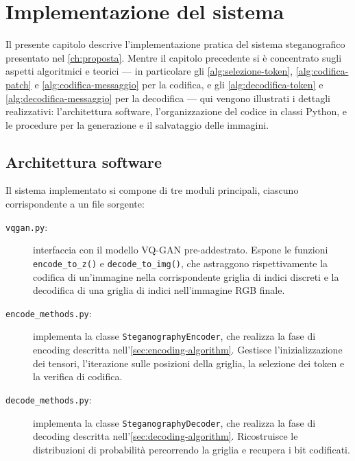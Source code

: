 
\chapter{Implementazione del sistema}
\label{ch:implementazione}

Il presente capitolo descrive l'implementazione pratica del sistema steganografico presentato nel \autoref{ch:proposta}. Mentre il capitolo precedente si è concentrato sugli aspetti algoritmici e teorici — in particolare gli \autoref{alg:selezione-token}, \ref{alg:codifica-patch} e \ref{alg:codifica-messaggio} per la codifica, e gli \autoref{alg:decodifica-token} e \ref{alg:decodifica-messaggio} per la decodifica — qui vengono illustrati i dettagli realizzativi: l'architettura software, l'organizzazione del codice in classi Python, e le procedure per la generazione e il salvataggio delle immagini.

\section{Architettura software}
\label{sec:architettura-software}

Il sistema implementato si compone di tre moduli principali, ciascuno corrispondente a un file sorgente:

\begin{description}
	\item[\texttt{vqgan.py}:] interfaccia con il modello VQ-GAN pre-addestrato. Espone le funzioni \texttt{encode\_to\_z()} e \texttt{decode\_to\_img()}, che astraggono rispettivamente la codifica di un'immagine nella corrispondente griglia di indici discreti e la decodifica di una griglia di indici nell'immagine RGB finale.
	
	\item[\texttt{encode\_methods.py}:] implementa la classe \texttt{SteganographyEncoder}, che realizza la fase di encoding descritta nell'\autoref{sec:encoding-algorithm}. Gestisce l'inizializzazione dei tensori, l'iterazione sulle posizioni della griglia, la selezione dei token e la verifica di codifica.
	
	\item[\texttt{decode\_methods.py}:] implementa la classe \texttt{SteganographyDecoder}, che realizza la fase di decoding descritta nell'\autoref{sec:decoding-algorithm}. Ricostruisce le distribuzioni di probabilità percorrendo la griglia e recupera i bit codificati.
\end{description}

